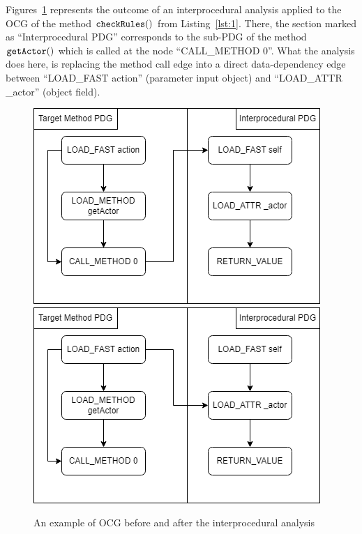 \documentclass[%
  chapterprefix=false,%
  open=right,%
  twoside=true,%
  paper=a4,%
  logofile={Figures/logo.png},%
  thesistype=master,%
  UKenglish,%
]{se2thesis}
\newcommand{\callable}[2][]{\(\text{\texttt{#2}}(#1)\)}
\begin{document}
Figures~\ref{fig:inter_analysis} represents the outcome of an interprocedural analysis applied to the OCG of the method \callable{checkRules} from Listing~\ref{lst:1}.
There, the section marked as ``Interprocedural PDG'' corresponds to the sub-PDG of the method \callable{getActor} which is called at the node ``CALL\_METHOD 0''.
What the analysis does here, is replacing the method call edge into a direct data-dependency edge between ``LOAD\_FAST action'' (parameter input object) and ``LOAD\_ATTR \_actor'' (object field).

\begin{figure}[htb]
    \includegraphics[width=\linewidth]{Figures/before_analysis.png}
  \endminipage\hfill
    \includegraphics[width=\linewidth]{Figures/after_analysis.png}
  \endminipage\hfill
\caption{An example of OCG before and after the interprocedural analysis}\label{fig:inter_analysis}
\end{figure}
\end{document}
